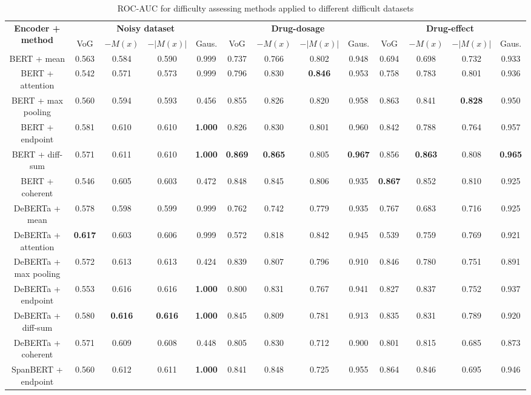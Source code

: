 \documentclass{article}
\begin{document}
\begin{table}[!htb]
    \centering
    \caption{ROC-AUC for difficulty assessing methods applied to different difficult datasets}\label{tab:diff_val}
    {
    \tiny
    \begin{tabular}{|c|*{12}{c|}}
    \hline
    \multirow{2}{*}{\textbf{Encoder + method}} & \multicolumn{4}{c|}{\textbf{Noisy dataset}} & \multicolumn{4}{c|}{\textbf{Drug-dosage}} & \multicolumn{4}{c|}{\textbf{Drug-effect}} \\ \cline{2-13}
    & VoG & $-M(x)$ & $-|M(x)|$ & Gaus. & VoG & $-M(x)$ & $-|M(x)|$ & Gaus. & VoG & $-M(x)$ & $-|M(x)|$ & Gaus. \\ \hline
    BERT + mean & 0.563 & 0.584 & 0.590 & 0.999 & 0.737 & 0.766 & 0.802 & 0.948 & 0.694 & 0.698 & 0.732 & 0.933 \\ \hline
    BERT + attention & 0.542 & 0.571 & 0.573 & 0.999 & 0.796 & 0.830 & \textbf{0.846} & 0.953 & 0.758 & 0.783 & 0.801 & 0.936 \\ \hline
    BERT + max pooling & 0.560 & 0.594 & 0.593 & 0.456 & 0.855 & 0.826 & 0.820 & 0.958 & 0.863 & 0.841 & \textbf{0.828} & 0.950 \\ \hline
    BERT + endpoint & 0.581 & 0.610 & 0.610 & \textbf{1.000} & 0.826 & 0.830 & 0.801 & 0.960 & 0.842 & 0.788 & 0.764 & 0.957 \\ \hline
    BERT + diff-sum & 0.571 & 0.611 & 0.610 & \textbf{1.000} & \textbf{0.869} & \textbf{0.865} & 0.805 & \textbf{0.967} & 0.856 & \textbf{0.863} & 0.808 & \textbf{0.965} \\ \hline
    BERT + coherent & 0.546 & 0.605 & 0.603 & 0.472 & 0.848 & 0.845 & 0.806 & 0.935 & \textbf{0.867} & 0.852 & 0.810 & 0.925 \\ \hline
    DeBERTa + mean & 0.578 & 0.598 & 0.599 & 0.999 & 0.762 & 0.742 & 0.779 & 0.935 & 0.767 & 0.683 & 0.716 & 0.925 \\ \hline
    DeBERTa + attention & \textbf{0.617} & 0.603 & 0.606 & 0.999 & 0.572 & 0.818 & 0.842 & 0.945 & 0.539 & 0.759 & 0.769 & 0.921 \\ \hline
    DeBERTa + max pooling & 0.572 & 0.613 & 0.613 & 0.424 & 0.839 & 0.807 & 0.796 & 0.910 & 0.846 & 0.780 & 0.751 & 0.891 \\ \hline
    DeBERTa + endpoint & 0.553 & 0.616 & 0.616 & \textbf{1.000} & 0.800 & 0.831 & 0.767 & 0.941 & 0.827 & 0.837 & 0.752 & 0.937 \\ \hline
    DeBERTa + diff-sum & 0.580 & \textbf{0.616} & \textbf{0.616} & \textbf{1.000} & 0.845 & 0.809 & 0.781 & 0.913 & 0.835 & 0.831 & 0.789 & 0.920 \\ \hline
    DeBERTa + coherent & 0.571 & 0.609 & 0.608 & 0.448 & 0.805 & 0.830 & 0.712 & 0.900 & 0.801 & 0.815 & 0.685 & 0.873 \\ \hline
    SpanBERT + endpoint & 0.560 & 0.612 & 0.611 & \textbf{1.000} & 0.841 & 0.848 & 0.725 & 0.955 & 0.864 & 0.846 & 0.695 & 0.946 \\ \hline
    \end{tabular}
    }
\end{table}



\end{document}
